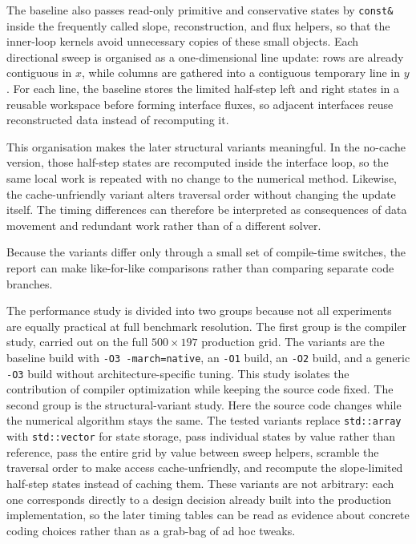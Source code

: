 \documentclass[final,3p,times,twocolumn]{elsarticle}
\begin{document}
The baseline also passes read-only primitive and conservative states by \texttt{const\&} inside the frequently called slope, reconstruction, and flux helpers, so that the inner-loop kernels avoid unnecessary copies of these small objects. Each directional sweep is organised as a one-dimensional line update: rows are already contiguous in $x$, while columns are gathered into a contiguous temporary line in $y$. For each line, the baseline stores the limited half-step left and right states in a reusable workspace before forming interface fluxes, so adjacent interfaces reuse reconstructed data instead of recomputing it.

This organisation makes the later structural variants meaningful. In the no-cache version, those half-step states are recomputed inside the interface loop, so the same local work is repeated with no change to the numerical method. Likewise, the cache-unfriendly variant alters traversal order without changing the update itself. The timing differences can therefore be interpreted as consequences of data movement and redundant work rather than of a different solver.

Because the variants differ only through a small set of compile-time switches, the report can make like-for-like comparisons rather than comparing separate code branches.

The performance study is divided into two groups because not all experiments are equally practical at full benchmark resolution. The first group is the compiler study, carried out on the full $500 \times 197$ production grid. The variants are the baseline build with \texttt{-O3 -march=native}, an \texttt{-O1} build, an \texttt{-O2} build, and a generic \texttt{-O3} build without architecture-specific tuning. This study isolates the contribution of compiler optimization while keeping the source code fixed. The second group is the structural-variant study. Here the source code changes while the numerical algorithm stays the same. The tested variants replace \texttt{std::array} with \texttt{std::vector} for state storage, pass individual states by value rather than reference, pass the entire grid by value between sweep helpers, scramble the traversal order to make access cache-unfriendly, and recompute the slope-limited half-step states instead of caching them. These variants are not arbitrary: each one corresponds directly to a design decision already built into the production implementation, so the later timing tables can be read as evidence about concrete coding choices rather than as a grab-bag of ad hoc tweaks.
\end{document}
